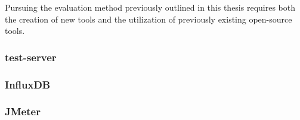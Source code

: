 Pursuing the evaluation method previously outlined in this thesis requires both
the creation of new tools and the utilization of previously existing open-source
tools.

\subsubsection{test-server}



\subsubsection{InfluxDB}



\subsubsection{JMeter}





